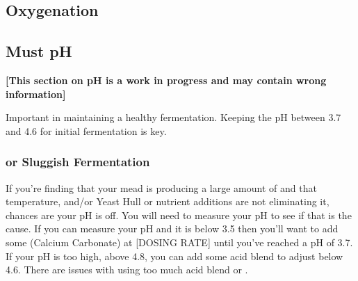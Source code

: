 \documentclass{article}
\begin{document}
 \subsection{Oxygenation}

 \subsection{Must pH}
\textbf{[This section on pH is a work in progress and may contain wrong information]}

  Important in maintaining a healthy fermentation. Keeping the pH between 3.7 and 4.6 for initial fermentation is key.

  \subsubsection{ or Sluggish Fermentation}
   If you're finding that your mead is producing a large amount of  and that temperature, and/or Yeast Hull or nutrient additions are not eliminating it, 
   chances are your pH is off. You will need to measure your pH to see if that is the cause. If you can measure your pH and it is
   below 3.5 then you'll want to add some  (Calcium Carbonate) at [DOSING RATE] until you've reached a pH of 3.7. If your pH is too high, above 4.8, 
   you can add some acid blend to adjust below 4.6. There are issues with using too much acid blend or .
\end{document}

